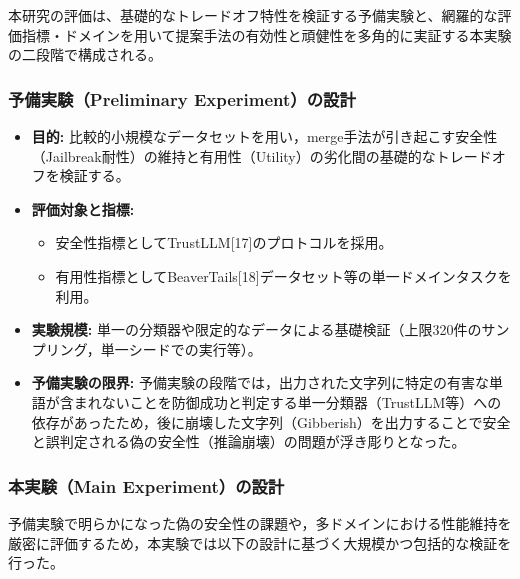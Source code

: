 \documentclass{article}
\begin{document}
本研究の評価は、基礎的なトレードオフ特性を検証する予備実験と、網羅的な評価指標・ドメインを用いて提案手法の有効性と頑健性を多角的に実証する本実験の二段階で構成される。

\subsubsection{予備実験（Preliminary Experiment）の設計}

\begin{itemize}
    \item \textbf{目的:}
    比較的小規模なデータセットを用い，merge手法が引き起こす安全性（Jailbreak耐性）の維持と有用性（Utility）の劣化間の基礎的なトレードオフを検証する。
    \item \textbf{評価対象と指標:}
    \begin{itemize}
        \item 安全性指標としてTrustLLM[17]のプロトコルを採用。
        \item 有用性指標としてBeaverTails[18]データセット等の単一ドメインタスクを利用。
    \end{itemize}
    \item \textbf{実験規模:}
    単一の分類器や限定的なデータによる基礎検証（上限320件のサンプリング，単一シードでの実行等）。
    \item \textbf{予備実験の限界:}
    予備実験の段階では，出力された文字列に特定の有害な単語が含まれないことを防御成功と判定する単一分類器（TrustLLM等）への依存があったため，後に崩壊した文字列（Gibberish）を出力することで安全と誤判定される偽の安全性（推論崩壊）の問題が浮き彫りとなった。
\end{itemize}

\subsubsection{本実験（Main Experiment）の設計}
予備実験で明らかになった偽の安全性の課題や，多ドメインにおける性能維持を厳密に評価するため，本実験では以下の設計に基づく大規模かつ包括的な検証を行った。
\end{document}
